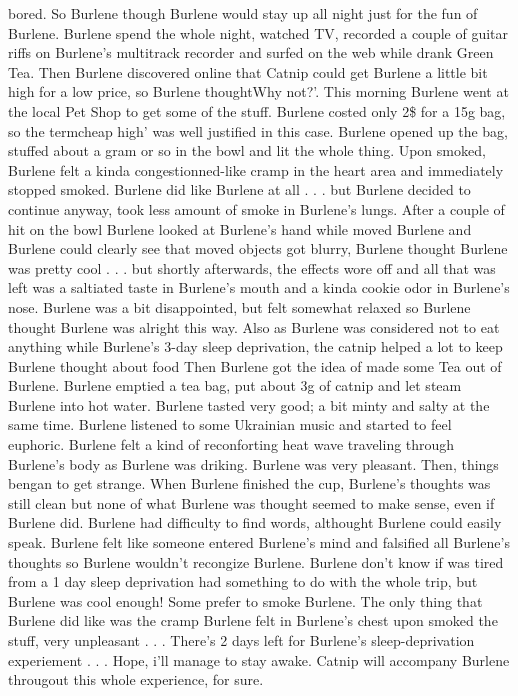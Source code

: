 \documentclass[12pt]{book}
\begin{document}
bored. So Burlene though Burlene would stay up all night just for the fun of Burlene. Burlene spend the whole night, watched TV, recorded a couple of guitar riffs on Burlene's multitrack recorder and surfed on the web while drank Green Tea. Then Burlene discovered online that Catnip could get Burlene a little bit high for a low price, so Burlene thoughtWhy not?'. This morning Burlene went at the local Pet Shop to get some of the stuff. Burlene costed only 2\$ for a 15g bag, so the termcheap high' was well justified in this case. Burlene opened up the bag, stuffed about a gram or so in the bowl and lit the whole thing. Upon smoked, Burlene felt a kinda congestionned-like cramp in the heart area and immediately stopped smoked. Burlene did like Burlene at all . . .  but Burlene decided to continue anyway, took less amount of smoke in Burlene's lungs. After a couple of hit on the bowl Burlene looked at Burlene's hand while moved Burlene and Burlene could clearly see that moved objects got blurry, Burlene thought Burlene was pretty cool . . .  but shortly afterwards, the effects wore off and all that was left was a saltiated taste in Burlene's mouth and a kinda cookie odor in Burlene's nose. Burlene was a bit disappointed, but felt somewhat relaxed so Burlene thought Burlene was alright this way. Also as Burlene was considered not to eat anything while Burlene's 3-day sleep deprivation, the catnip helped a lot to keep Burlene thought about food Then Burlene got the idea of made some Tea out of Burlene. Burlene emptied a tea bag, put about 3g of catnip and let steam Burlene into hot water. Burlene tasted very good; a bit minty and salty at the same time. Burlene listened to some Ukrainian music and started to feel euphoric. Burlene felt a kind of reconforting heat wave traveling through Burlene's body as Burlene was driking. Burlene was very pleasant. Then, things bengan to get strange. When Burlene finished the cup, Burlene's thoughts was still clean but none of what Burlene was thought seemed to make sense, even if Burlene did. Burlene had difficulty to find words, althought Burlene could easily speak. Burlene felt like someone entered Burlene's mind and falsified all Burlene's thoughts so Burlene wouldn't recongize Burlene. Burlene don't know if was tired from a 1 day sleep deprivation had something to do with the whole trip, but Burlene was cool enough! Some prefer to smoke Burlene. The only thing that Burlene did like was the cramp Burlene felt in Burlene's chest upon smoked the stuff, very unpleasant . . .  There's 2 days left for Burlene's sleep-deprivation experiement . . .  Hope, i'll manage to stay awake. Catnip will accompany Burlene througout this whole experience, for sure.
\end{document}
